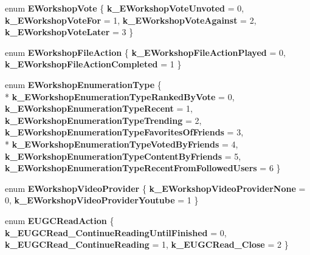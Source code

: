 \begin{DoxyCompactItemize}
\item 
\hypertarget{namespaceValve_1_1Steamworks_ae8de283456646edfb6275a197cda10c4}{}enum {\bfseries E\+Workshop\+Vote} \{ {\bfseries k\+\_\+\+E\+Workshop\+Vote\+Unvoted} = 0, 
{\bfseries k\+\_\+\+E\+Workshop\+Vote\+For} = 1, 
{\bfseries k\+\_\+\+E\+Workshop\+Vote\+Against} = 2, 
{\bfseries k\+\_\+\+E\+Workshop\+Vote\+Later} = 3
 \}\label{namespaceValve_1_1Steamworks_ae8de283456646edfb6275a197cda10c4}

\item 
\hypertarget{namespaceValve_1_1Steamworks_ad5a0099039aa3250083ce3adc7f61ef4}{}enum {\bfseries E\+Workshop\+File\+Action} \{ {\bfseries k\+\_\+\+E\+Workshop\+File\+Action\+Played} = 0, 
{\bfseries k\+\_\+\+E\+Workshop\+File\+Action\+Completed} = 1
 \}\label{namespaceValve_1_1Steamworks_ad5a0099039aa3250083ce3adc7f61ef4}

\item 
\hypertarget{namespaceValve_1_1Steamworks_a001229b5c5fa0e2569bee944d8ca9cf7}{}enum {\bfseries E\+Workshop\+Enumeration\+Type} \{ \\*
{\bfseries k\+\_\+\+E\+Workshop\+Enumeration\+Type\+Ranked\+By\+Vote} = 0, 
{\bfseries k\+\_\+\+E\+Workshop\+Enumeration\+Type\+Recent} = 1, 
{\bfseries k\+\_\+\+E\+Workshop\+Enumeration\+Type\+Trending} = 2, 
{\bfseries k\+\_\+\+E\+Workshop\+Enumeration\+Type\+Favorites\+Of\+Friends} = 3, 
\\*
{\bfseries k\+\_\+\+E\+Workshop\+Enumeration\+Type\+Voted\+By\+Friends} = 4, 
{\bfseries k\+\_\+\+E\+Workshop\+Enumeration\+Type\+Content\+By\+Friends} = 5, 
{\bfseries k\+\_\+\+E\+Workshop\+Enumeration\+Type\+Recent\+From\+Followed\+Users} = 6
 \}\label{namespaceValve_1_1Steamworks_a001229b5c5fa0e2569bee944d8ca9cf7}

\item 
\hypertarget{namespaceValve_1_1Steamworks_a61a5ccce84b70e757234e98c90c0cc97}{}enum {\bfseries E\+Workshop\+Video\+Provider} \{ {\bfseries k\+\_\+\+E\+Workshop\+Video\+Provider\+None} = 0, 
{\bfseries k\+\_\+\+E\+Workshop\+Video\+Provider\+Youtube} = 1
 \}\label{namespaceValve_1_1Steamworks_a61a5ccce84b70e757234e98c90c0cc97}

\item 
\hypertarget{namespaceValve_1_1Steamworks_ac4889b14ff19052ede184ae58cfc5720}{}enum {\bfseries E\+U\+G\+C\+Read\+Action} \{ {\bfseries k\+\_\+\+E\+U\+G\+C\+Read\+\_\+\+Continue\+Reading\+Until\+Finished} = 0, 
{\bfseries k\+\_\+\+E\+U\+G\+C\+Read\+\_\+\+Continue\+Reading} = 1, 
{\bfseries k\+\_\+\+E\+U\+G\+C\+Read\+\_\+\+Close} = 2
 \}\label{namespaceValve_1_1Steamworks_ac4889b14ff19052ede184ae58cfc5720}


\end{DoxyCompactItemize}
